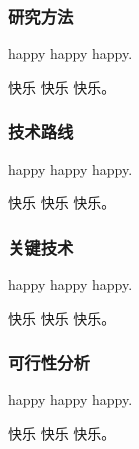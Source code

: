 
\subsubsection{研究方法}


happy happy happy.

快乐 快乐 快乐。

\subsubsection{技术路线}

happy happy happy.

快乐 快乐 快乐。


\subsubsection{关键技术}

happy happy happy.

快乐 快乐 快乐。

\subsubsection{可行性分析}


happy happy happy.

快乐 快乐 快乐。

\clearpage